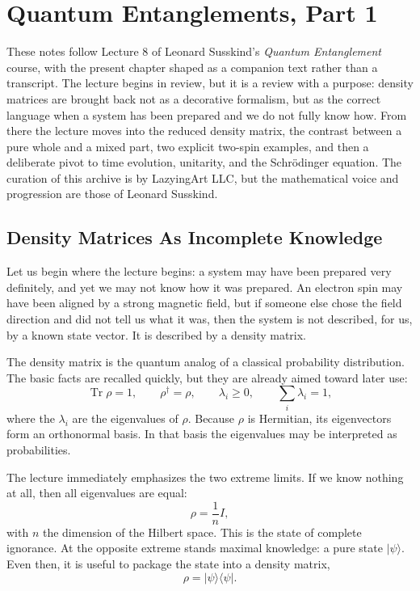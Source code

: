 \chapter{Quantum Entanglements, Part 1}

These notes follow Lecture 8 of Leonard Susskind's \emph{Quantum Entanglement} course, with the present chapter shaped as a companion text rather than a transcript. The lecture begins in review, but it is a review with a purpose: density matrices are brought back not as a decorative formalism, but as the correct language when a system has been prepared and we do not fully know how. From there the lecture moves into the reduced density matrix, the contrast between a pure whole and a mixed part, two explicit two-spin examples, and then a deliberate pivot to time evolution, unitarity, and the Schr\"odinger equation. The curation of this archive is by LazyingArt LLC, but the mathematical voice and progression are those of Leonard Susskind.

\section{Density Matrices As Incomplete Knowledge}

Let us begin where the lecture begins: a system may have been prepared very definitely, and yet we may not know how it was prepared. An electron spin may have been aligned by a strong magnetic field, but if someone else chose the field direction and did not tell us what it was, then the system is not described, for us, by a known state vector. It is described by a density matrix.

The density matrix is the quantum analog of a classical probability distribution. The basic facts are recalled quickly, but they are already aimed toward later use:
\begin{equation}
\operatorname{Tr}\rho = 1,
\qquad
\rho^\dagger = \rho,
\qquad
\lambda_i \geq 0,
\qquad
\sum_i \lambda_i = 1,
\end{equation}
where the \(\lambda_i\) are the eigenvalues of \(\rho\). Because \(\rho\) is Hermitian, its eigenvectors form an orthonormal basis. In that basis the eigenvalues may be interpreted as probabilities.

The lecture immediately emphasizes the two extreme limits. If we know nothing at all, then all eigenvalues are equal:
\begin{equation}
\rho = \frac{1}{n} I,
\end{equation}
with \(n\) the dimension of the Hilbert space. This is the state of complete ignorance. At the opposite extreme stands maximal knowledge: a pure state \(|\psi\rangle\). Even then, it is useful to package the state into a density matrix,
\begin{equation}
\rho = |\psi\rangle\langle\psi|.
\end{equation}

